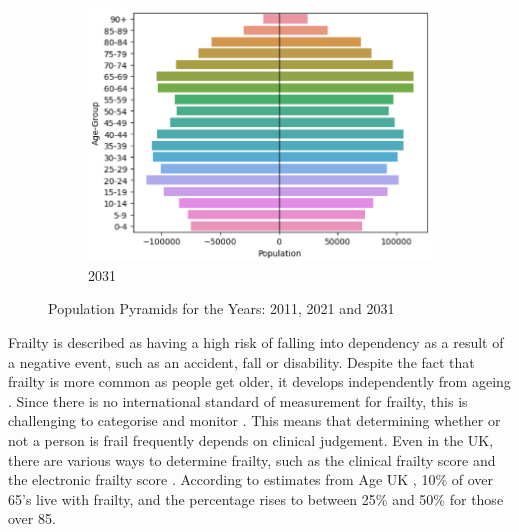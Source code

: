 \documentclass[../thesis.tex]{subfiles}
\begin{document}
\begin{figure}[h!]
\begin{subfigure}{0.33\textwidth}
    \includegraphics[width=\textwidth]{Chapters/Chapter1/Figures/Census2031.png}
    \caption{2031}
\end{subfigure}
    \caption{Population Pyramids for the Years: 2011, 2021 and 2031}
    \label{fig:PopulationPyramids}
\end{figure}





Frailty is described as having a high risk of falling into dependency as a result of a negative event, such as an accident, fall or disability. Despite the fact that frailty is more common as people get older, it develops independently from ageing \cite{Topinkova2008}. Since there is no international standard of measurement for frailty, this is challenging to categorise and monitor \cite{Dent2016}. This means that determining whether or not a person is frail frequently depends on clinical judgement. Even in the UK, there are various ways to determine frailty, such as the clinical frailty score \cite{Rockwood2005} and the electronic frailty score \cite{NHSEnglanda}. According to estimates from Age UK \cite{AgeUK2020}, 10\% of over 65's live with frailty, and the percentage rises to between 25\% and 50\% for those over 85.
\end{document}
